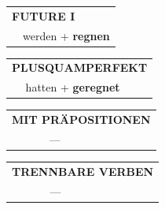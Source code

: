 \documentclass[10pt,a4paper]{revtex4-2}
\begin{document}
\begin{verbbox}
\begin{tabular}{rl}
    \multicolumn{2}{l}{\textbf{FUTURE I} }\\
  &  werden + \textbf{regnen}\\
 
  \end{tabular}
\hfill
   \begin{tabular}{rl}
      \multicolumn{2}{l}{\textbf{PLUSQUAMPERFEKT}}\\
  &  hatten + \textbf{geregnet}\\
  \end{tabular}
  
  \vspace{10pt}



\begin{tabular}{lll}
\multicolumn{3}{l}{\textbf{MIT PRÄPOSITIONEN}}\\
& ---\\
\end{tabular}
\hfill
\begin{tabular}{lll}
\multicolumn{3}{l}{\textbf{TRENNBARE VERBEN}}\\
& ---\\
\end{tabular}

  \vspace{-5pt}

\end{verbbox}
\end{document}

